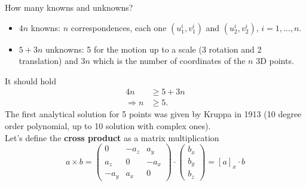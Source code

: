 \documentclass[a4paper,12 pt]{article}
\theoremstyle{definition}
\theoremstyle{remark}
\theoremstyle{definition}
\theoremstyle{definition}
\theoremstyle{definition}
\theoremstyle{remark}
\theoremstyle{definition}
\begin{document}
How many knowns and unknowns?
\begin{itemize}
\item $4n$ knowns: $n$ correspondences, each one $(u_1^i,v_1^i)$ and $(u_2^i,v_2^i)$, $i=1,\hdots,n$.
\item $5+3n$ unknowns: 5 for the motion up to a scale (3 rotation and 2 translation) and $3n$ which is the number of coordinates of the $n$ 3D points.
\end{itemize}
It should hold
\begin{equation}
\begin{split}
4n &\geq 5+3n\\
\Rightarrow n&\geq 5.
\end{split}
\end{equation}
The first analytical solution for 5 points was given by Kruppa in 1913 (10 degree order polynomial, up to 10 solution with complex ones).\\
Let's define the \textbf{cross product} as a matrix multiplication
\begin{equation}
a\times b = \begin{pmatrix}
 0&-a_z&a_y\\
 a_z&0&-a_x\\
 -a_y&a_x&0
 \end{pmatrix}\cdot \begin{pmatrix}
 b_x\\
 b_y\\
 b_z
 \end{pmatrix}=[a]_x\cdot b
\end{equation}
\end{document}
